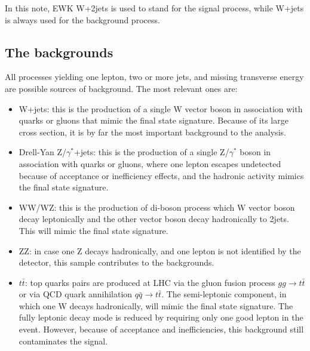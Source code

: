 In this note, EWK W+2jets is used to stand for the signal process, while W+jets is always used for the background process.
\subsection {The backgrounds}
All processes yielding one lepton, two or more jets, 
and missing transverse energy are possible sources 
of background. The most relevant ones are:
\begin{itemize}
  \item W+jets: this is the production of a single W vector boson 
        in association with quarks or gluons that mimic the final state 
        signature. 
        Because of its large cross section, it is by far the most important 
	background to the analysis.
  \item Drell-Yan Z/$\gamma^{*}$+jets: this is the production of 
        a single Z/$\gamma^{*}$ boson in association with quarks or gluons, 
	where one lepton escapes undetected because of acceptance or 
        inefficiency effects, and the hadronic activity mimics the final 
	 state signature.
  \item WW/WZ: this is the production of di-boson process which W vector boson decay leptonically and the other vector boson decay hadronically to 2jets. This will  mimic the final state signature. 
  \item ZZ: in case one Z decays hadronically, and one lepton is not identified by the detector,
             this sample contributes to the backgrounds.
  \item $t\bar{t}$: top quarks pairs are produced at LHC via the gluon fusion process
              $gg\to{}t\bar{t}$ or via QCD quark annihilation $q\bar{q}\to{}t\bar{t}$.
              The semi-leptonic component, in which one W decays hadronically, will mimic the final state signature.
              The fully leptonic decay mode is reduced by requiring only 
	      one good lepton in the event.
              However, because of acceptance and inefficiencies, 
              this background still contaminates the signal.

\end{itemize}
